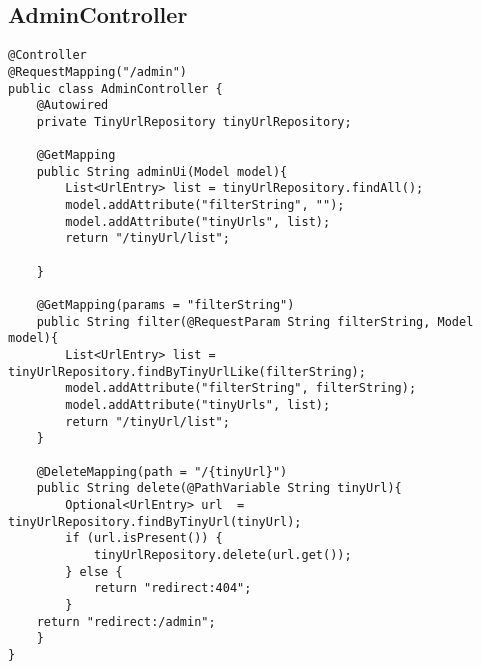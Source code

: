 \subsection{AdminController}
\begin{verbatim}
@Controller
@RequestMapping("/admin")
public class AdminController {
    @Autowired
    private TinyUrlRepository tinyUrlRepository;

    @GetMapping
    public String adminUi(Model model){
        List<UrlEntry> list = tinyUrlRepository.findAll();
        model.addAttribute("filterString", "");
        model.addAttribute("tinyUrls", list);
        return "/tinyUrl/list";

    }

    @GetMapping(params = "filterString")
    public String filter(@RequestParam String filterString, Model model){
        List<UrlEntry> list = tinyUrlRepository.findByTinyUrlLike(filterString);
        model.addAttribute("filterString", filterString);
        model.addAttribute("tinyUrls", list);
        return "/tinyUrl/list";
    }

    @DeleteMapping(path = "/{tinyUrl}")
    public String delete(@PathVariable String tinyUrl){
        Optional<UrlEntry> url  = tinyUrlRepository.findByTinyUrl(tinyUrl);
        if (url.isPresent()) {
            tinyUrlRepository.delete(url.get());
        } else {
            return "redirect:404";
        }
    return "redirect:/admin";
    }
}
\end{verbatim}